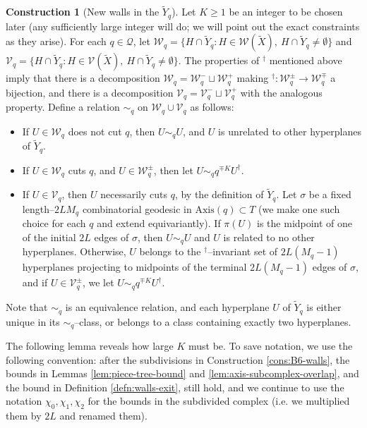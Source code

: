 \documentclass[11pt,oneside]{amsart}
\newcounter{ax}
\theoremstyle{definition}
\newtheorem{cons}[thm]{Construction}
\newcommand{\axis}{\mathrm{Axis}}
\begin{document}
\begin{cons}[New walls in the $\widetilde Y_q$]
Let $K\geq 1$ be an integer to be chosen later (any sufficiently large integer will do; we will point out the exact constraints as they arise). For each $q\in\mathcal Q$, let $\mathcal W_q=\{H\cap \widetilde Y_q:H\in\mathcal W(\widetilde X),\ H\cap\widetilde Y_q\neq \emptyset\}$ and $\mathcal V_q=\{H\cap \widetilde Y_q:H\in\mathcal V(\widetilde X),\ H\cap\widetilde Y_q\neq\emptyset\}$.  The properties of ${}^\dagger$ mentioned above imply that there is a decomposition $\mathcal W_q=\mathcal W_q^-\sqcup \mathcal W_q^+$ making ${}^\dagger:\mathcal W_q^\pm\to\mathcal W_q^\mp$ a bijection, and there is a decomposition $\mathcal V_q=\mathcal V_q^-\sqcup\mathcal V_q^+$ with the analogous property. Define a relation $\sim_q$ on $\mathcal W_q\cup\mathcal V_q$ as follows:
\begin{itemize}
 \item If $U\in\mathcal W_q$ does not cut $q$, then $U\sim_q U$, and $U$ is unrelated to other hyperplanes of $\widetilde Y_q$.
 
 \item If $U\in\mathcal W_q$ cuts $q$, and $U\in\mathcal W_q^\pm$, then let $U\sim_q q^{\mp K} U^\dagger$.
 
 \item If $U\in\mathcal V_q$, then $U$ necessarily cuts $q$, by the definition of $\widetilde Y_q$.  Let $\sigma$ be a fixed length--$2LM_q$ combinatorial geodesic in $\axis(q)\subset T$ (we make one such choice for each $q$ and extend equivariantly).  If $\pi(U)$ is the midpoint of one of the initial $2L$ edges of $\sigma$, then $U\sim_q U$ and $U$ is related to no other hyperplanes.  Otherwise, $U$ belongs to the ${}^\dagger$--invariant set of $2L(M_q-1)$ hyperplanes projecting to midpoints of the terminal $2L(M_q-1)$ edges of $\sigma$, and if $U\in\mathcal V^\pm_q$, we let $U\sim_q q^{\mp K}U^\dagger$.
\end{itemize}

Note that $\sim_q$ is an equivalence relation, and each hyperplane $U$ of $\widetilde Y_q$ is either unique in its $\sim_q$--class, or belongs to a class containing exactly two hyperplanes.
\end{cons}

The following lemma reveals how large $K$ must be.  To save notation, we use the following convention: after the subdivisions in Construction \ref{cons:B6-walls}, the bounds in Lemmas \ref{lem:piece-tree-bound} and \ref{lem:axis-subcomplex-overlap}, and the bound in Definition \ref{defn:walls-exit}, still hold, and we continue to use the notation $\chi_0,\chi_1,\chi_2$ for the bounds in the subdivided complex (i.e. we multiplied them by $2L$ and renamed them).
\end{document}
